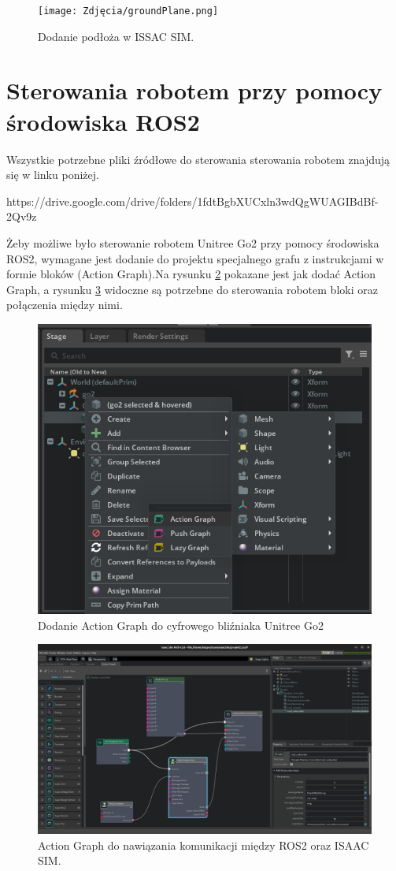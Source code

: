 \documentclass[12pt]{article}
\begin{document}
\begin{figure}[h]
    \centering
    \texttt{[image: Zdjęcia/groundPlane.png]}
    \caption{Dodanie podłoża w ISSAC SIM.}
    \label{fig:groundPlane}
\end{figure}

\clearpage

\section{Sterowania robotem przy pomocy środowiska ROS2}

Wszystkie potrzebne pliki źródłowe do sterowania sterowania robotem znajdują się w linku poniżej.

https://drive.google.com/drive/folders/1fdtBgbXUCxln3wdQgWUAGIBdBf-2Qv9z
\vspace{10pt}

Żeby możliwe było sterowanie robotem Unitree Go2 przy pomocy środowiska ROS2, wymagane jest dodanie do projektu specjalnego grafu z instrukcjami w formie bloków (Action Graph).Na rysunku \ref{fig:jakDodacAction} pokazane jest jak dodać Action Graph, a rysunku \ref{fig:actionGraph} widoczne są potrzebne do sterowania robotem bloki oraz połączenia między nimi. 

\begin{figure}[h]
    \centering
    \includegraphics[width=0.5\linewidth]{Zdjęcia/dodanieActionGraph.png}
    \caption{Dodanie Action Graph do cyfrowego bliźniaka Unitree Go2}
    \label{fig:jakDodacAction}
\end{figure}

\clearpage

\begin{figure}[h]
    \centering
    \includegraphics[width=0.75\linewidth]{Zdjęcia/actionGraph.png}
    \caption{Action Graph do nawiązania komunikacji między ROS2 oraz ISAAC SIM.}
    \label{fig:actionGraph}
\end{figure}
\end{document}
